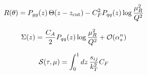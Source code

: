 \begin{equation}
  R(\theta) = P_{gg}(z) \, \Theta(z - z_{\rm cut}) - C_F^2 P_{qq}(z) \log\frac{\mu_R^2}{Q^2}
  \label{eq:6}
\end{equation}

\begin{equation}
  \Sigma(z) = \frac{C_A}{2} P_{qq}(z) \log\frac{\mu_R^2}{Q^2} + \mathcal{O}(\alpha_s^{n})
  \label{eq:7}
\end{equation}

\begin{equation}
  \mathcal{S}(\tau, \mu) = \int_0^1 dz \, \frac{s_{ij}}{k_T^2} C_F
  \label{eq:8}
\end{equation}

